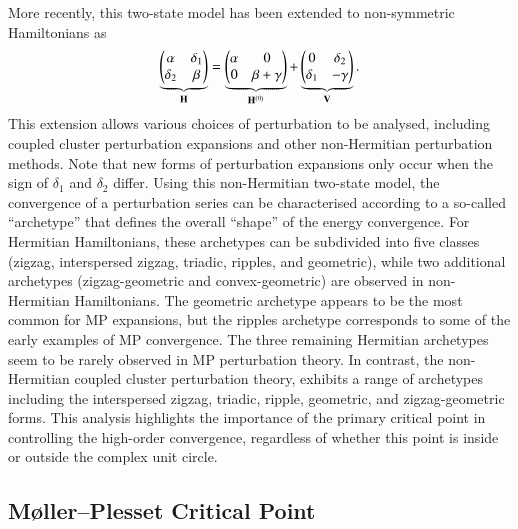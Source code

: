\documentclass[aps,prb,reprint,noshowkeys,superscriptaddress]{revtex4-1}
\newcommand{\bH}{\mathbf{H}}
\newcommand{\bV}{\mathbf{V}}
\begin{document}
More recently, this two-state model has been extended to non-symmetric Hamiltonians as\cite{Olsen_2019}
\begin{equation}
	\underbrace{\mqty(\alpha & \delta_1 \\ \delta_2 & \beta)}_{\bH} = \underbrace{\mqty(\alpha & 0 \\ 0 & \beta + \gamma )}_{\bH^{(0)}} + \underbrace{\mqty( 0 & \delta_2 \\ \delta_1 & - \gamma)}_{\bV}.
\end{equation}
This extension allows various choices of perturbation to be analysed, including coupled cluster 
perturbation expansions \cite{Pawlowski_2019a,Pawlowski_2019b,Pawlowski_2019c,Pawlowski_2019d,Pawlowski_2019e} 
and other non-Hermitian perturbation methods.
Note that new forms of perturbation expansions only occur when the sign of $\delta_1$ and $\delta_2$ differ.
Using this non-Hermitian two-state model, the convergence of a perturbation series can be characterised 
according to a so-called ``archetype'' that defines the overall ``shape'' of the energy convergence.\cite{Olsen_2019} 
For Hermitian Hamiltonians, these archetypes can be subdivided into five classes 
(zigzag, interspersed zigzag, triadic, ripples, and geometric), 
while two additional archetypes (zigzag-geometric and convex-geometric) are observed in non-Hermitian Hamiltonians.
%
The geometric archetype appears to be the most common for MP expansions,\cite{Olsen_2019} but the 
ripples archetype corresponds to some of the early examples of MP convergence. \cite{Handy_1985,Lepetit_1988,Leininger_2000}
The three remaining Hermitian archetypes seem to be rarely observed in MP perturbation theory.
In contrast, the non-Hermitian coupled cluster perturbation theory,%
\cite{Pawlowski_2019a,Pawlowski_2019b,Pawlowski_2019c,Pawlowski_2019d,Pawlowski_2019e} exhibits a range of archetypes
including the interspersed zigzag, triadic, ripple, geometric, and zigzag-geometric forms.
This analysis highlights the importance of the primary critical point in controlling the high-order convergence, 
regardless of whether this point is inside or outside the complex unit circle. \cite{Handy_1985,Olsen_2000}

\subsection{M{\o}ller--Plesset Critical Point}
\label{sec:MP_critical_point}
\end{document}
